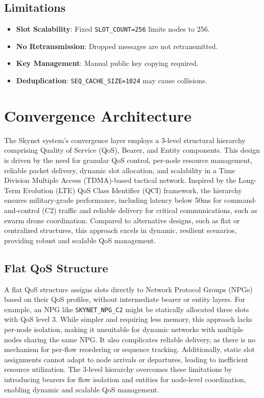 \documentclass{article}
\begin{document}
\subsection{Limitations}
\begin{itemize}
    \item \textbf{Slot Scalability}: Fixed \texttt{SLOT\_COUNT=256} limits nodes to 256.
    \item \textbf{No Retransmission}: Dropped messages are not retransmitted.
    \item \textbf{Key Management}: Manual public key copying required.
    \item \textbf{Deduplication}: \texttt{SEQ\_CACHE\_SIZE=1024} may cause collisions.
\end{itemize}

\section{Convergence Architecture}
The Skynet system's convergence layer employs a 3-level structural hierarchy comprising Quality of
Service (QoS), Bearer, and Entity components. This design is driven by the need for granular QoS
control, per-node resource management, reliable packet delivery, dynamic slot allocation, and
scalability in a Time Division Multiple Access (TDMA)-based tactical network. Inspired by the
Long-Term Evolution (LTE) QoS Class Identifier (QCI) framework, the hierarchy ensures military-grade
performance, including latency below 50ms for command-and-control (C2) traffic and reliable delivery
for critical communications, such as swarm drone coordination. Compared to alternative designs, such
as flat or centralized structures, this approach excels in dynamic, resilient scenarios, providing
robust and scalable QoS management.

\subsection{Flat QoS Structure}
A flat QoS structure assigns slots directly to Network Protocol Groups (NPGs) based on their QoS
profiles, without intermediate bearer or entity layers. For example, an NPG like
\texttt{SKYNET\_NPG\_C2} might be statically allocated three slots with QoS level 3. While simpler
and requiring less memory, this approach lacks per-node isolation, making it unsuitable for dynamic
networks with multiple nodes sharing the same NPG. It also complicates reliable delivery, as there is
no mechanism for per-flow reordering or sequence tracking. Additionally, static slot assignments
cannot adapt to node arrivals or departures, leading to inefficient resource utilization. The 3-level
hierarchy overcomes these limitations by introducing bearers for flow isolation and entities for
node-level coordination, enabling dynamic and scalable QoS management.
\end{document}
